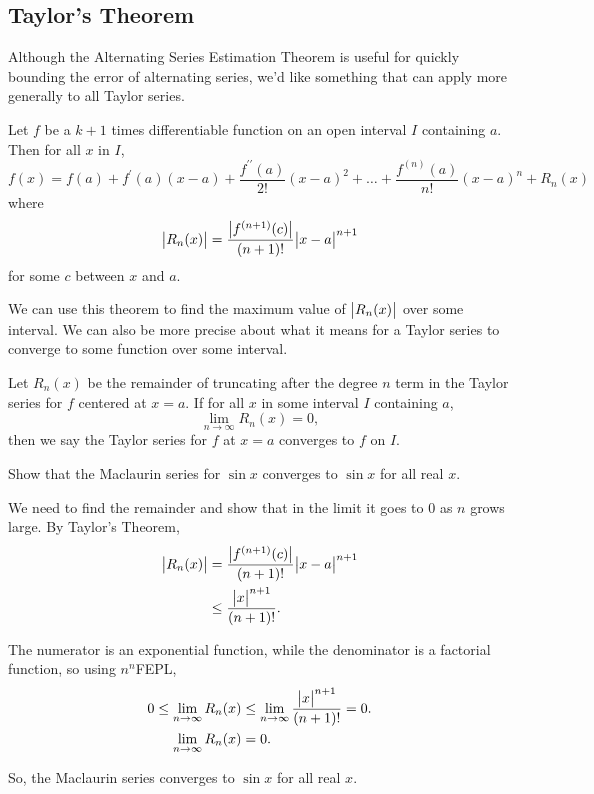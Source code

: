 \subsection{Taylor's Theorem}
Although the Alternating Series Estimation Theorem is useful for quickly bounding the error of alternating series, we'd like something that can apply more generally to all Taylor series.
\begin{theorem}
	Let $f$ be a $k+1$ times differentiable function on an open interval $I$ containing $a$.
	Then for all $x$ in $I$,
	\begin{equation*}
		f(x) = f(a) + f^\prime(a)(x-a) + \frac{f^{\prime\prime}(a)}{2!}(x-a)^2 + \ldots + \frac{f^{(n)}(a)}{n!}(x-a)^n + R_n(x)
	\end{equation*}
	where
	\begin{equation*}
		\big\lvert R_n(x) \big\rvert = \frac{\big\lvert f^{(n+1)}(c) \big\rvert}{(n+1)!}\big\lvert x-a \big\rvert^{n+1}
	\end{equation*}
	for some $c$ between $x$ and $a$.
\end{theorem}

We can use this theorem to find the maximum value of $\big\lvert R_n(x) \big\rvert$ over some interval.
We can also be more precise about what it means for a Taylor series to converge to some function over some interval.
\begin{definition}
	Let $R_n(x)$ be the remainder of truncating after the degree $n$ term in the Taylor series for $f$ centered at $x=a$.
	If for all $x$ in some interval $I$ containing $a$,
	\begin{equation*}
		\lim_{n\to\infty}{R_n(x)} = 0,
	\end{equation*}
	then we say the Taylor series for $f$ at $x=a$ converges to $f$ on $I$.
\end{definition}

\begin{example}
	Show that the Maclaurin series for $\sin{x}$ converges to $\sin{x}$ for all real $x$.
\end{example}
\begin{answer}
	We need to find the remainder and show that in the limit it goes to 0 as $n$ grows large.
	By Taylor's Theorem,
	\begin{align*}
		\big\lvert R_n(x) \big\rvert &= \frac{\big\lvert f^{(n+1)}(c) \big\rvert}{(n+1)!}\big\lvert x-a \big\rvert^{n+1} \\
		&\leq \frac{\big\lvert x \big\rvert^{n+1}}{(n+1)!}.
	\end{align*}
	
	The numerator is an exponential function, while the denominator is a factorial function, so using $n^n$FEPL,
	\begin{align*}
		0 \leq \lim_{n\to\infty}{R_n(x)} &\leq \lim_{n\to\infty}{\frac{\big\lvert x \big\rvert^{n+1}}{(n+1)!}} = 0. \\
		\lim_{n\to\infty}{R_n(x)} &= 0.
	\end{align*}
	
	So, the Maclaurin series converges to $\sin{x}$ for all real $x$.
\end{answer}


